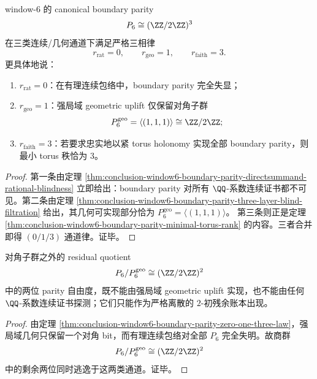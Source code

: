 \begin{theorem}\label{thm:conclusion-window6-boundary-parity-zero-one-three-law}
window-\(6\) 的 canonical boundary parity
\[
P_6\cong (\ZZ/2\ZZ)^3
\]
在三类连续/几何通道下满足严格三相律
\[
r_{\mathrm{rat}}=0,
\qquad
r_{\mathrm{geo}}=1,
\qquad
r_{\mathrm{faith}}=3.
\]
更具体地说：
\begin{enumerate}
  \item \(r_{\mathrm{rat}}=0\)：在有理连续包络中，boundary parity 完全失显；
  \item \(r_{\mathrm{geo}}=1\)：强局域 geometric uplift 仅保留对角子群
  \[
  P_6^{\mathrm{geo}}=\langle(1,1,1)\rangle\cong \ZZ/2\ZZ;
  \]
  \item \(r_{\mathrm{faith}}=3\)：若要求忠实地以紧 torus holonomy 实现全部 boundary parity，则最小 torus 秩恰为 \(3\)。
\end{enumerate}
\end{theorem}
\begin{proof}
第一条由定理 \ref{thm:conclusion-window6-boundary-parity-directsummand-rational-blindness} 立即给出：boundary parity 对所有 \(\QQ\)-系数连续证书都不可见。第二条由定理 \ref{thm:conclusion-window6-boundary-parity-three-layer-blind-filtration} 给出，其几何可实现部分恰为
\(
P_6^{\mathrm{geo}}=\langle(1,1,1)\rangle
\)。
第三条则正是定理 \ref{thm:conclusion-window6-boundary-parity-minimal-torus-rank} 的内容。三者合并即得 \((0/1/3)\) 通道律。证毕。
\end{proof}

\begin{corollary}\label{cor:conclusion-window6-boundary-two-residual-bits-nongeometric-nonrational}
对角子群之外的 residual quotient
\[
P_6/P_6^{\mathrm{geo}}\cong (\ZZ/2\ZZ)^2
\]
中的两位 parity 自由度，既不能由强局域 geometric uplift 实现，也不能由任何 \(\QQ\)-系数连续证书探测；它们只能作为严格离散的 \(2\)-初残余账本出现。
\end{corollary}
\begin{proof}
由定理 \ref{thm:conclusion-window6-boundary-parity-zero-one-three-law}，强局域几何只保留一个对角 bit，而有理连续包络对全部 \(P_6\) 完全失明。故商群
\[
P_6/P_6^{\mathrm{geo}}\cong (\ZZ/2\ZZ)^2
\]
中的剩余两位同时逃逸于这两类通道。证毕。
\end{proof}

